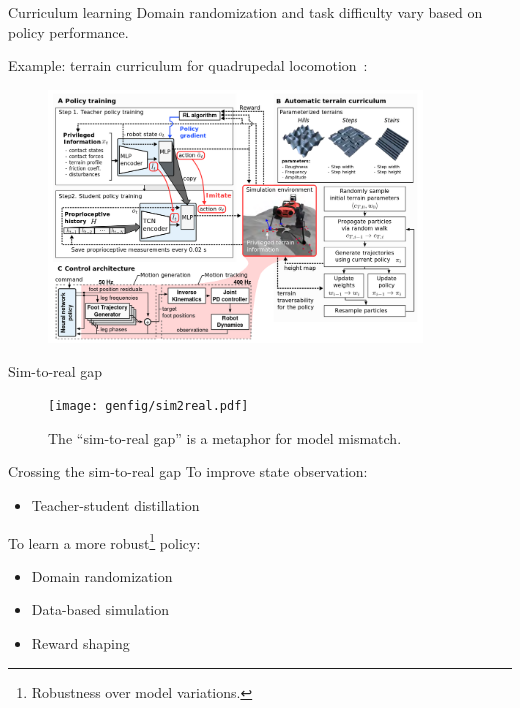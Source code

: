 \documentclass[10pt, aspectratio=1610]{beamer}
\begin{document}
\begin{frame}{Curriculum learning}
    Domain randomization and task difficulty vary based on policy performance.

    Example: terrain curriculum for quadrupedal locomotion~\cite{lee2020}:
    \begin{figure}
        \includegraphics[height=6.7cm]{figures/quadruped-curriculum.png}
    \end{figure}
\end{frame}

\begin{frame}{Sim-to-real gap}
    \begin{figure}
        \texttt{[image: genfig/sim2real.pdf]}
        \caption{The ``sim-to-real gap'' is a metaphor for model mismatch.}
    \end{figure}
\end{frame}

\begin{frame}{Crossing the sim-to-real gap}
    To improve state observation:
    \begin{itemize}
        \item Teacher-student distillation
    \end{itemize}
    To learn a more robust\footnote{Robustness over model variations.} policy:
    \begin{itemize}
        \item Domain randomization
        \item Data-based simulation
        \item Reward shaping
    \end{itemize}
\end{frame}

\end{document}
